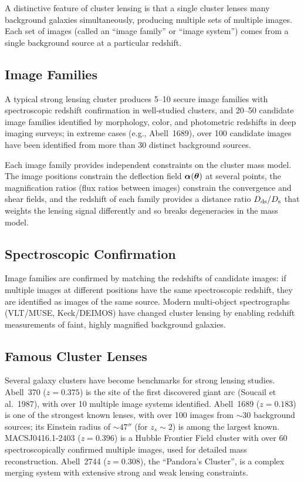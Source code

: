 A distinctive feature of cluster lensing is that a single
cluster lenses many background galaxies simultaneously,
producing multiple sets of multiple images.  Each set of images
(called an ``image family'' or ``image system'') comes from a single
background source at a particular redshift.

\subsection{Image Families}

A typical strong lensing cluster produces 5--10 secure image
families with spectroscopic redshift confirmation in well-studied
clusters, and 20--50 candidate image families identified by
morphology, color, and photometric redshifts in deep imaging
surveys; in extreme cases (e.g., Abell~1689), over 100 candidate
images have been identified from more than 30 distinct background
sources.

Each image family provides independent constraints on the cluster
mass model.  The image positions constrain the deflection field
$\boldsymbol{\alpha}(\boldsymbol{\theta})$ at several points, the magnification ratios
(flux ratios between images) constrain the convergence and shear
fields, and the redshift of each family provides a distance ratio
$D_{\mathrm{ds}}/D_{\mathrm{s}}$ that weights the lensing signal differently and so breaks
degeneracies in the mass model.

\subsection{Spectroscopic Confirmation}

Image families are confirmed by matching the redshifts of candidate
images: if multiple images at different positions have the same
spectroscopic redshift, they are identified as images of the same
source.  Modern multi-object spectrographs (VLT/MUSE, Keck/DEIMOS)
have changed cluster lensing by enabling redshift
measurements of faint, highly magnified background galaxies.

\subsection{Famous Cluster Lenses}

Several galaxy clusters have become benchmarks for strong lensing
studies.  Abell~370 ($z = 0.375$) is the site of the first
discovered giant arc (Soucail et al.\ 1987), with over 10 multiple
image systems identified.  Abell~1689 ($z = 0.183$) is one of the
strongest known lenses, with over 100 images from $\sim$30
background sources; its Einstein radius of $\sim 47''$ (for
$z_s \sim 2$) is among the largest known.  MACSJ0416.1-2403
($z = 0.396$) is a Hubble Frontier Field cluster with over 60
spectroscopically confirmed multiple images, used for detailed mass
reconstruction.  Abell~2744 ($z = 0.308$), the ``Pandora's
Cluster'', is a complex merging system with extensive strong and
weak lensing constraints.



